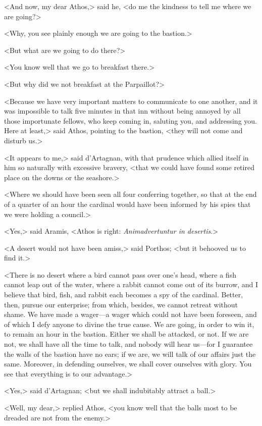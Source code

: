<And now, my dear Athos,> said he, <do me the kindness to tell me where we are going?> 

<Why, you see plainly enough we are going to the bastion.> 

<But what are we going to do there?> 

<You know well that we go to breakfast there.> 

<But why did we not breakfast at the Parpaillot?> 

<Because we have very important matters to communicate to one another, and it was impossible to talk five minutes in that inn without being annoyed by all those importunate fellows, who keep coming in, saluting you, and addressing you. Here at least,> said Athos, pointing to the bastion, <they will not come and disturb us.> 

<It appears to me,> said d'Artagnan, with that prudence which allied itself in him so naturally with excessive bravery, <that we could have found some retired place on the downs or the seashore.> 

<Where we should have been seen all four conferring together, so that at the end of a quarter of an hour the cardinal would have been informed by his spies that we were holding a council.> 

<Yes,> said Aramis, <Athos is right: \textit{Animadvertuntur in desertis}.> 

<A desert would not have been amiss,> said Porthos; <but it behooved us to find it.> 

<There is no desert where a bird cannot pass over one's head, where a fish cannot leap out of the water, where a rabbit cannot come out of its burrow, and I believe that bird, fish, and rabbit each becomes a spy of the cardinal. Better, then, pursue our enterprise; from which, besides, we cannot retreat without shame. We have made a wager---a wager which could not have been foreseen, and of which I defy anyone to divine the true cause. We are going, in order to win it, to remain an hour in the bastion. Either we shall be attacked, or not. If we are not, we shall have all the time to talk, and nobody will hear us---for I guarantee the walls of the bastion have no ears; if we are, we will talk of our affairs just the same. Moreover, in defending ourselves, we shall cover ourselves with glory. You see that everything is to our advantage.> 

<Yes,> said d'Artagnan; <but we shall indubitably attract a ball.> 

<Well, my dear,> replied Athos, <you know well that the balls most to be dreaded are not from the enemy.> 

